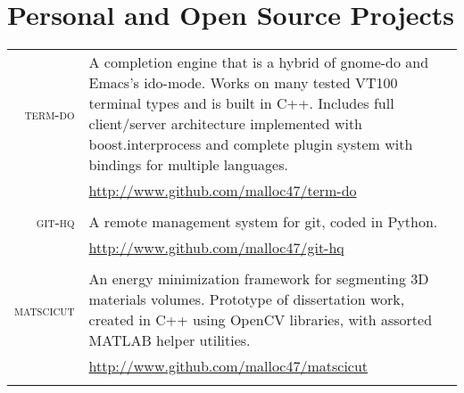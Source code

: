 \documentclass[a4paper,10pt]{article}
\begin{document}
\section{Personal and Open Source Projects}
\begin{longtable}{r|p{13.5cm}}
  \textsc{term-do} & \footnotesize{A completion engine that is a hybrid of gnome-do and Emacs's ido-mode. Works on many tested VT100 terminal types and is built in C++. Includes full client/server architecture implemented with boost.interprocess and complete plugin system with bindings for multiple languages.}\\
  &\href{http://www.github.com/malloc47/term-do}{http://www.github.com/malloc47/term-do}\\
  \multicolumn{2}{c}{} \\
  \textsc{git-hq} & \footnotesize{A remote management system for git, coded in Python.}\\
  &\href{http://www.github.com/malloc47/git-hq}{http://www.github.com/malloc47/git-hq}\\
  \multicolumn{2}{c}{} \\
  \textsc{matscicut} & \footnotesize{An energy minimization framework for segmenting 3D materials volumes. Prototype of dissertation work, created in C++ using OpenCV libraries, with assorted MATLAB helper utilities.}\\
  &\href{http://www.github.com/malloc47/matscicut}{http://www.github.com/malloc47/matscicut}\\
  \multicolumn{2}{c}{} \\
\end{longtable}

\nocite{waggoner:11}
\nocite{wang2011}
\nocite{temlyakov2010}
\nocite{zhang2010}
\renewcommand\refname{Publications}



\end{document}

